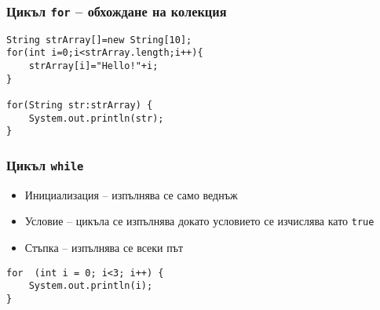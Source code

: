 \documentclass[ignorenonframetext, hyperref=unicode,unicode]{beamer}
\begin{document}
\begin{frame}[containsverbatim]\frametitle{Цикъл \lstinline{for} -- обхождане на колекция}
\begin{lstlisting}
String strArray[]=new String[10];
for(int i=0;i<strArray.length;i++){
	strArray[i]="Hello!"+i;
}

for(String str:strArray) {
	System.out.println(str);			
}
\end{lstlisting}
\end{frame}

\begin{frame}[containsverbatim]\frametitle{Цикъл \lstinline{while}}
\begin{itemize}
 \item Инициализация -- изпълнява се само веднъж
 \item Условие -- цикъла се изпълнява докато условието се изчислява като \lstinline{true}
 \item Стъпка -- изпълнява се всеки път
\end{itemize}
\begin{lstlisting}
for  (int i = 0; i<3; i++) {
	System.out.println(i);
}
\end{lstlisting}
\end{frame}
\end{document}

